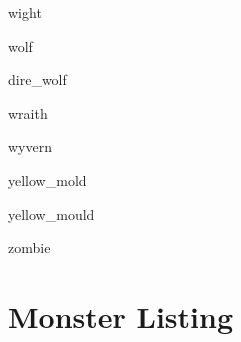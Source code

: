 \documentclass[letterpaper,serif]{module}
\begin{document}
\begin{newmonster}{wight}\end{newmonster}

\begin{newmonster}{wolf}\end{newmonster}

\begin{newmonster}{dire_wolf}\end{newmonster}

\begin{newmonster}{wraith}\end{newmonster}

\begin{newmonster}{wyvern}\end{newmonster}

\begin{newmonster}{yellow_mold}\end{newmonster}

\begin{newmonster}{yellow_mould}\end{newmonster}

\begin{newmonster}{zombie}\end{newmonster}

\onecolumn

\section*{Monster Listing}
\label{wanderingmonsters}
\end{document}
